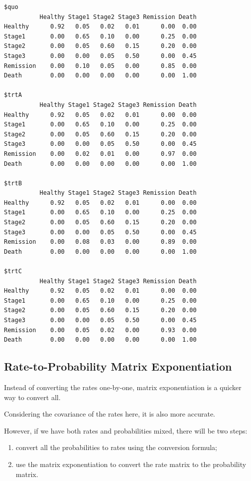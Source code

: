 \documentclass[
  letterpaper,
  DIV=11,
  numbers=noendperiod,
  oneside]{scrartcl}
\begin{document}
\begin{verbatim}
$quo
          Healthy Stage1 Stage2 Stage3 Remission Death
Healthy      0.92   0.05   0.02   0.01      0.00  0.00
Stage1       0.00   0.65   0.10   0.00      0.25  0.00
Stage2       0.00   0.05   0.60   0.15      0.20  0.00
Stage3       0.00   0.00   0.05   0.50      0.00  0.45
Remission    0.00   0.10   0.05   0.00      0.85  0.00
Death        0.00   0.00   0.00   0.00      0.00  1.00

$trtA
          Healthy Stage1 Stage2 Stage3 Remission Death
Healthy      0.92   0.05   0.02   0.01      0.00  0.00
Stage1       0.00   0.65   0.10   0.00      0.25  0.00
Stage2       0.00   0.05   0.60   0.15      0.20  0.00
Stage3       0.00   0.00   0.05   0.50      0.00  0.45
Remission    0.00   0.02   0.01   0.00      0.97  0.00
Death        0.00   0.00   0.00   0.00      0.00  1.00

$trtB
          Healthy Stage1 Stage2 Stage3 Remission Death
Healthy      0.92   0.05   0.02   0.01      0.00  0.00
Stage1       0.00   0.65   0.10   0.00      0.25  0.00
Stage2       0.00   0.05   0.60   0.15      0.20  0.00
Stage3       0.00   0.00   0.05   0.50      0.00  0.45
Remission    0.00   0.08   0.03   0.00      0.89  0.00
Death        0.00   0.00   0.00   0.00      0.00  1.00

$trtC
          Healthy Stage1 Stage2 Stage3 Remission Death
Healthy      0.92   0.05   0.02   0.01      0.00  0.00
Stage1       0.00   0.65   0.10   0.00      0.25  0.00
Stage2       0.00   0.05   0.60   0.15      0.20  0.00
Stage3       0.00   0.00   0.05   0.50      0.00  0.45
Remission    0.00   0.05   0.02   0.00      0.93  0.00
Death        0.00   0.00   0.00   0.00      0.00  1.00
\end{verbatim}

\hypertarget{rate-to-probability-matrix-exponentiation}{%
\subsection{Rate-to-Probability Matrix
Exponentiation}\label{rate-to-probability-matrix-exponentiation}}

Instead of converting the rates one-by-one, matrix exponentiation is a
quicker way to convert all.

Considering the covariance of the rates here, it is also more accurate.

However, if we have both rates and probabilities mixed, there will be
two steps:

\begin{enumerate}
\def\labelenumi{\arabic{enumi}.}
\item
  convert all the probabilities to rates using the conversion formula;
\item
  use the matrix exponentiation to convert the rate matrix to the
  probability matrix.
\end{enumerate}
\end{document}
